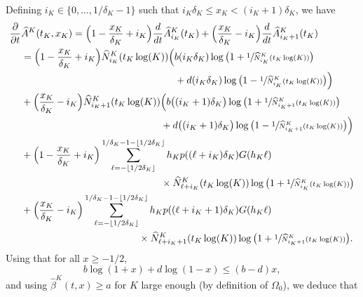 \documentclass[10pt]{amsart}
\let\f\frac
\theoremstyle{plain}
\theoremstyle{remark}
\begin{document}
Defining $i_K\in\{0,\ldots,1/\delta_K-1\}$ such that $i_K\delta_K\leq {x_K}<(i_K+1)\delta_K$, we have\vspace*{-3pt}
\begin{align*}
\frac{\partial}{\partial t} &\widehat A^K(t_K,x_K) =
\Bigl(1-\f {x_K}{\delta_K}+i_K\Bigr)\frac{d}{dt} \widehat A_{i_K}^K(t_K)+\Bigl(\f {x_K}{\delta_K}-i_K\Bigr) \frac{d}{dt} \widehat A_{i_K+1}^K(t_K)\\
&=\Bigl(1-\f {x_K}{\delta_K}+i_K\Bigr) \widehat N_{i_K}^K(t_K \log(K))\Big(b(i_K\delta_K) \log \big(1+\sfrac{1}{ \widehat N_{i_K}^K(t_K\log(K))} \big)\\
& \hspace{5.5cm} +d(i_K\delta_K) \log \big(1-\sfrac{1}{ \widehat N_{i_K}^K(t_K\log(K))} \big)\Big)\\
&+\Bigl(\f {x_K}{\delta_K}-i_K\Bigr) \widehat N_{i_K+1}^K(t_K\log(K))\Big(b\big((i_K+1)\delta_K\big) \log \big(1+\sfrac{1}{ \widehat N_{i_K+1}^K(t_K\log(K))} \big) \\
& \hspace{5cm} +d\big((i_K+1)\delta_K\big) \log \big(1-\sfrac{1}{ \widehat N_{i_K+1}^K(t_K\log(K))} \big)\Big)\\
&+ \Bigl(1-\f {x_K}{\delta_K}+i_K\Bigr) \sum_{\ell=-\lfloor 1/2\delta_K\rfloor}^{1/\delta_K-1-\lfloor 1/2\delta_K\rfloor}h_Kp((\ell+i_K)\delta_K)G(h_K\ell) \\
& \hspace{5cm} \times \widehat N_{\ell+i_K}^K(t_K\log(K))\log \big(1+\sfrac{1}{ \widehat N_{i_K}^K(t_K\log(K))} \big)\\
&+ \Bigl(\f {x_K}{\delta_K}-i_K\Bigr) \sum_{\ell=-\lfloor 1/2\delta_K\rfloor}^{1/\delta_K-1-\lfloor 1/2\delta_K\rfloor}h_Kp((\ell+i_K+1)\delta_K)G(h_K\ell)\\
& \hspace{4.2cm} \times \widehat N_{\ell+i_K+1}^K(t_K\log(K))\log \big(1+\sfrac{1}{ \widehat N_{i_K+1}^K(t_K\log(K))} \big).
\end{align*}
Using that for all $x\geq -1/2$,\vspace*{-3pt}\enlargethispage{\baselineskip}
\begin{equation*}
b\log(1+x)+d\log(1-x)\le (b-d) x,\label{approxlog2}
\end{equation*}
and using $\widehat{\beta}^K(t,x)\geq a$ for $K$ large enough (by definition of $\Omega_0$), we deduce that\vspace*{-3pt}
\end{document}
